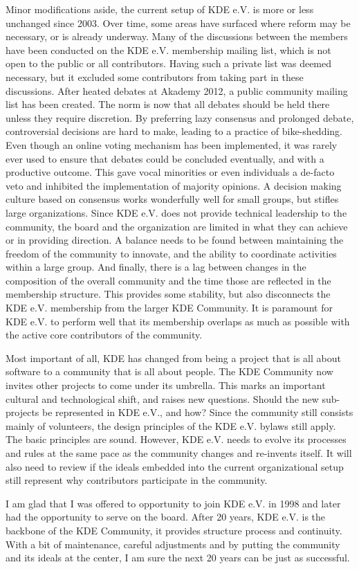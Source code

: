 Minor modifications aside, the current setup of KDE e.V. is more or
less unchanged since 2003. Over time, some areas have surfaced where
reform may be necessary, or is already underway. Many of the
discussions between the members 
have been conducted on the KDE e.V. membership mailing list, which is
not open to the public or all contributors. Having such a private list
was deemed necessary, but it excluded some contributors from taking
part in these discussions. After heated debates at Akademy 2012, a
public community mailing list has been created. The norm is now that all
debates should be held there unless they require discretion. By
preferring lazy consensus and prolonged debate, controversial decisions
are hard to make, leading to a practice of bike-shedding.
Even though an online voting mechanism has been implemented, it was
rarely ever used to ensure that debates could be concluded eventually,
and with a productive outcome. This gave vocal minorities or even
individuals a de-facto veto and inhibited the implementation of
majority opinions. A decision making culture based on consensus works
wonderfully well for small groups, but stifles large organizations.
Since KDE e.V. does not provide technical leadership to
the community, the board and the organization are limited in what they
can achieve or in providing direction. A balance needs to be found
between maintaining the freedom of the community to innovate, and the
ability to coordinate activities within a large group. And finally,
there is a lag between changes in the composition of the overall
community and the time those are reflected in the membership
structure. This provides some stability, but also disconnects the KDE
e.V. membership from the larger KDE Community. It is paramount
for KDE e.V. to perform well that its membership overlaps as much as
possible with the active core contributors of the community.

Most important of all, KDE has changed from being a project that is
all about software to a community that is all about people. The KDE
Community now invites other projects to come under its umbrella. This
marks an important cultural and technological shift, and raises new
questions. Should the new sub-projects be represented in KDE e.V., and
how? Since the community still consists mainly of volunteers, the
design principles of the KDE e.V. bylaws still apply. The basic
principles are sound. However, KDE e.V. needs to evolve its processes
and rules at the same pace as the community changes and re-invents
itself. It will also need to review if the ideals embedded into the
current organizational setup still represent why contributors
participate in the community. 

I am glad that I was offered to opportunity to join KDE e.V. in 1998
and later had the opportunity to serve on the board. After 20 years,
KDE e.V. is the backbone of the KDE Community, it provides structure
process and continuity. With a bit of maintenance, careful adjustments
and by putting the community and its ideals at the center, I am sure
the next 20 years can be just as successful.
